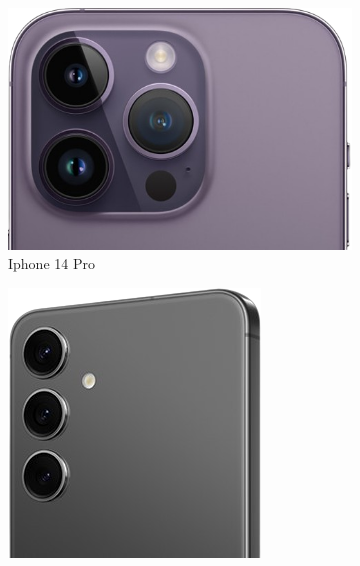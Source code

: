 \begin{figure}[ht]
	\captionsetup[subfigure]{labelformat=empty}
	\centering
	\begin{subfigure}{0.3\textwidth}
		\centering
		\includegraphics[width=\textwidth]{images/back-camera-iphone-14-pro}
		\caption{Iphone 14 Pro}
	\end{subfigure}
	\hfill
	\begin{subfigure}{0.3\textwidth}
		\centering
		\includegraphics[width=\textwidth]{images/back-camera-galaxy-s24}

\end{subfigure}
\end{figure}
